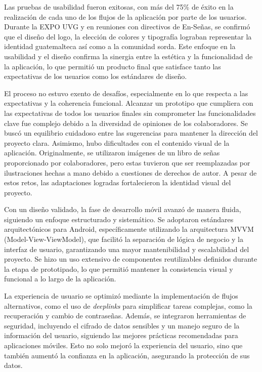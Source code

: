 Las pruebas de usabilidad fueron exitosas, con más del 75\% de éxito en la realización de cada uno de los flujos de la aplicación por parte de los usuarios. Durante la EXPO UVG y en reuniones con directivos de En-Señas, se confirmó que el diseño del logo, la elección de colores y tipografía lograban representar la identidad guatemalteca así como a la comunidad sorda. Este enfoque en la usabilidad y el diseño confirma la sinergia entre la estética y la funcionalidad de la aplicación, lo que permitió un producto final que satisface tanto las expectativas de los usuarios como los estándares de diseño.

El proceso no estuvo exento de desafíos, especialmente en lo que respecta a las expectativas y la coherencia funcional. Alcanzar un prototipo que cumpliera con las expectativas de todos los usuarios finales sin comprometer las funcionalidades clave fue complejo debido a la diversidad de opiniones de los colaboradores. Se buscó un equilibrio cuidadoso entre las sugerencias para mantener la dirección del proyecto clara. Asimismo, hubo dificultades con el contenido visual de la aplicación. Originalmente, se utilizaron imágenes de un libro de señas proporcionado por colaboradores, pero estas tuvieron que ser reemplazadas por ilustraciones hechas a mano debido a cuestiones de derechos de autor. A pesar de estos retos, las adaptaciones logradas fortalecieron la identidad visual del proyecto.

Con un diseño validado, la fase de desarrollo móvil avanzó de manera fluida, siguiendo un enfoque estructurado y sistemático. Se adoptaron estándares arquitectónicos para Android, específicamente utilizando la arquitectura MVVM (Model-View-ViewModel), que facilitó la separación de lógica de negocio y la interfaz de usuario, garantizando una mayor mantenibilidad y escalabilidad del proyecto. Se hizo un uso extensivo de componentes reutilizables definidos durante la etapa de prototipado, lo que permitió mantener la consistencia visual y funcional a lo largo de la aplicación.

La experiencia de usuario se optimizó mediante la implementación de flujos alternativos, como el uso de \textit{deeplinks} para simplificar tareas complejas, como la recuperación y cambio de contraseñas. Además, se integraron herramientas de seguridad, incluyendo el cifrado de datos sensibles y un manejo seguro de la información del usuario, siguiendo las mejores prácticas recomendadas para aplicaciones móviles. Esto no solo mejoró la experiencia del usuario, sino que también aumentó la confianza en la aplicación, asegurando la protección de sus datos.

